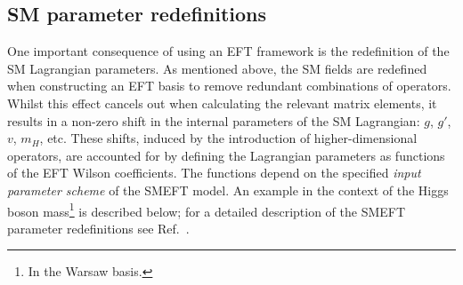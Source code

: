 \subsection{SM parameter redefinitions}
One important consequence of using an EFT framework is the redefinition of the SM Lagrangian parameters. As mentioned above, the SM fields are redefined when constructing an EFT basis to remove redundant combinations of operators. Whilst this effect cancels out when calculating the relevant matrix elements, it results in a non-zero shift in the internal parameters of the SM Lagrangian: $g$, $g'$, $v$, $m_H$, etc. These shifts, induced by the introduction of higher-dimensional operators, are accounted for by defining the Lagrangian parameters as functions of the EFT Wilson coefficients. The functions depend on the specified \textit{input parameter scheme} of the SMEFT model. An example in the context of the Higgs boson mass\footnote{In the Warsaw basis.} is described below; for a detailed description of the SMEFT parameter redefinitions see Ref.~\cite{Brivio:2017btx}.

